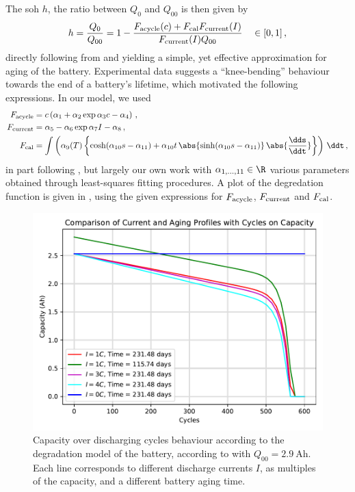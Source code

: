 \documentclass{prettytex/ox/mmsc-special-topic}
\begin{document}
  The \glsdesc{soh} $h$, the ratio between $Q_0$ and $Q_{00}$ is then given by
  $$h = \frac{Q_0}{Q_{00}} = 1 - \frac{F_{\rm acycle}(c) + F_{\rm cal} F_{\rm current}(I)}{F_{\rm current}(I) Q_{00}} \quad \in [0, 1]\,,$$
  directly following from  and yielding a simple, yet effective approximation for aging of the battery.
  Experimental data suggests a ``knee-bending'' behaviour towards the end of a battery's lifetime, which motivated the following expressions.
  In our model, we used
  \begin{align*}
    F_{\rm acycle}  & = c \left( \alpha_1 + \alpha_2 \exp{\alpha_3c-\alpha_4} \right)\,,                                                                                                                     \\
    F_{\rm current} & = \alpha_5 - \alpha_6 \exp{ \alpha_7 I - \alpha_8}\,,                                                                                                                                  \\
    F_{\rm cal}     & = \int \left( \alpha_9(T) \left\{\cosh({\alpha_{10}s - \alpha_{11}}) + \alpha_{10} t \, \abs{\sinh({\alpha_{10} s- \alpha_{11}})} \, \abs{ \frac{\dds}{\ddt}}\right\}\right) \,\ddt\,,
  \end{align*}
  in part following \cite{csfpaper}, but largely our own work
  with $\alpha_{1, ..., 11} \in \R$ various parameters obtained through least-squares fitting procedures.
  A plot of the degredation function is given in , using the given expressions for $F_{\rm acycle}$, $F_{\rm current}$ and $F_{\rm cal}$.

  \begin{figure}[H]
    \centering
    \includegraphics[width=0.7\linewidth]{figures/aging.pdf}
    \caption{Capacity over discharging cycles behaviour according to the degradation model of the battery, according to  with $Q_{00} = \SI{2.9}{\ampere\hour}$. Each line corresponds to different discharge currents $I$, as multiples of the capacity, and a different battery aging time.}
    \label{fig:aging}
  \end{figure}
\end{document}
